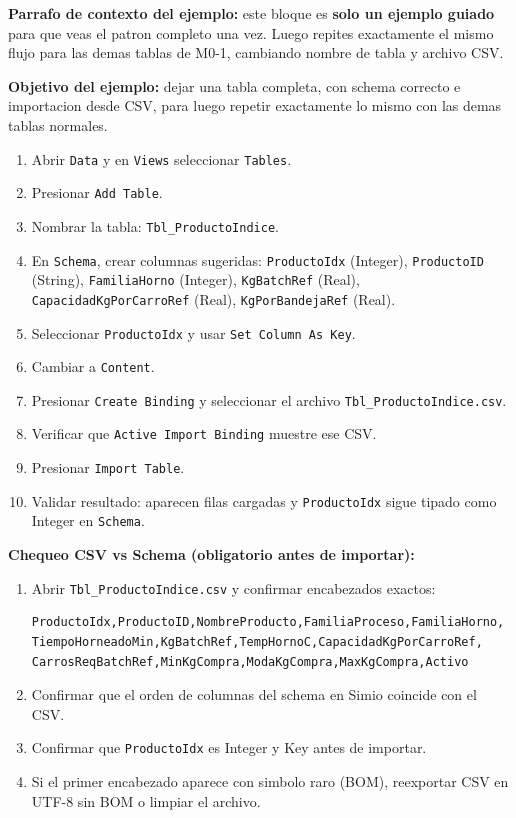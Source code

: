 \documentclass[11pt]{article}
\newcommand{\simio}[1]{\texttt{#1}}
\newcommand{\tabla}[1]{\texttt{#1}}
\newcommand{\state}[1]{\texttt{#1}}
\newcommand{\dato}[1]{\texttt{#1}}
\begin{document}
\textbf{Parrafo de contexto del ejemplo:} este bloque es \textbf{solo un ejemplo guiado} para que veas el patron completo una vez. Luego repites exactamente el mismo flujo para las demas tablas de M0-1, cambiando nombre de tabla y archivo CSV.

\textbf{Objetivo del ejemplo:} dejar una tabla completa, con schema correcto e importacion desde CSV, para luego repetir exactamente lo mismo con las demas tablas normales.

\begin{enumerate}
  \item Abrir \simio{Data} y en \simio{Views} seleccionar \simio{Tables}.
  \item Presionar \simio{Add Table}.
  \item Nombrar la tabla: \tabla{Tbl\_ProductoIndice}.
  \item En \simio{Schema}, crear columnas sugeridas: \state{ProductoIdx} (Integer), \state{ProductoID} (String), \state{FamiliaHorno} (Integer), \state{KgBatchRef} (Real), \state{CapacidadKgPorCarroRef} (Real), \state{KgPorBandejaRef} (Real).
  \item Seleccionar \state{ProductoIdx} y usar \simio{Set Column As Key}.
  \item Cambiar a \simio{Content}.
  \item Presionar \simio{Create Binding} y seleccionar el archivo \dato{Tbl\_ProductoIndice.csv}.
  \item Verificar que \simio{Active Import Binding} muestre ese CSV.
  \item Presionar \simio{Import Table}.
  \item Validar resultado: aparecen filas cargadas y \state{ProductoIdx} sigue tipado como Integer en \simio{Schema}.
\end{enumerate}

\textbf{Chequeo CSV vs Schema (obligatorio antes de importar):}
\begin{enumerate}
  \item Abrir \dato{Tbl\_ProductoIndice.csv} y confirmar encabezados exactos:
\begin{lstlisting}
ProductoIdx,ProductoID,NombreProducto,FamiliaProceso,FamiliaHorno,
TiempoHorneadoMin,KgBatchRef,TempHornoC,CapacidadKgPorCarroRef,
CarrosReqBatchRef,MinKgCompra,ModaKgCompra,MaxKgCompra,Activo
\end{lstlisting}
  \item Confirmar que el orden de columnas del schema en Simio coincide con el CSV.
  \item Confirmar que \state{ProductoIdx} es Integer y Key antes de importar.
  \item Si el primer encabezado aparece con simbolo raro (BOM), reexportar CSV en UTF-8 sin BOM o limpiar el archivo.
\end{enumerate}
\end{document}
